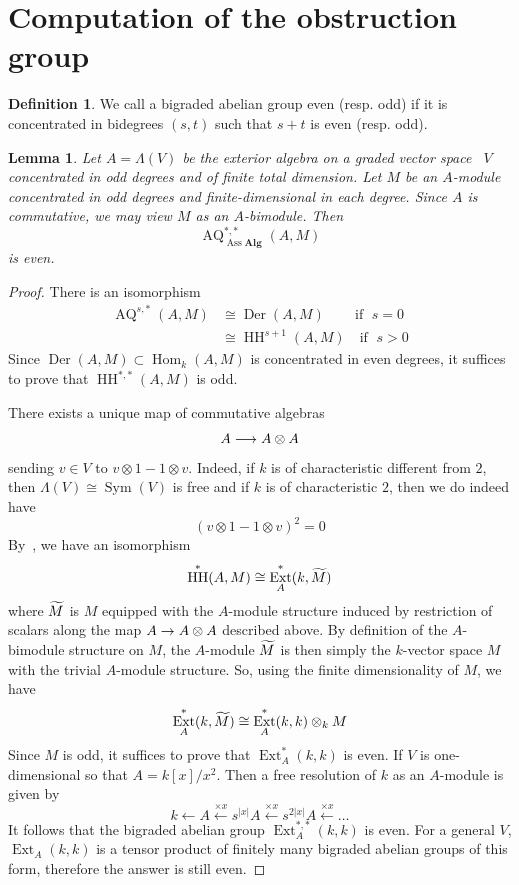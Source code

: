 \documentclass[10pt]{amsart}
\newtheorem{lemm}[theo]{Lemma}\newtheorem{prop}[theo]{Proposition}\newtheorem{coro}[theo]{Corollary}\newtheorem{conj}[theo]{Conjecture}
\theoremstyle{definition}\newtheorem{defi}[theo]{Definition}\newtheorem{rema}[theo]{Remark}\newtheorem{exam}[theo]{Example}\newtheorem{exem}[theo]{Example}\newtheorem{nota}[theo]{Notation}
\DeclareMathOperator{\Ass}{Ass}
\DeclareMathOperator{\Ext}{Ext}
\DeclareMathOperator{\Hom}{Hom}
\DeclareMathOperator{\HH}{HH}
\DeclareMathOperator{\Der}{Der}
\DeclareMathOperator{\AQ}{AQ}
\DeclareMathOperator{\sym}{Sym}
\newcommand{\alg}{\mathbf{Alg}}
\renewcommand*{\to}{\mathchoice{\longrightarrow}{\rightarrow}{\rightarrow}{\rightarrow}}
\let\oldtilde\tilde
\renewcommand*{\tilde}[1]{\mathchoice{\widetilde{#1}}{\widetilde{#1}}{\oldtilde{#1}}{\oldtilde{#1}}}
\begin{document}
\setcounter{section}{3}
\section{Computation of the obstruction group}

\begin{defi}
We call a bigraded abelian group even (resp. odd) if it is concentrated in bidegrees $(s,t)$ such that $s+t$ is even (resp. odd).
\end{defi}


\begin{lemm}\label{lemm : Hochschild}
Let $A=\Lambda(V)$ be the exterior algebra on a graded vector space ~$V$ concentrated in odd degrees and of finite total dimension. Let $M$ be an $A$-module concentrated in odd degrees and finite-dimensional in each degree. Since $A$ is commutative, we may view $M$ as an $A$-bimodule. Then
\[
\AQ_{\Ass\alg}^{*,*}(A,M)
\]
is even.
\end{lemm}

\begin{proof}
There is an isomorphism
\begin{align*}
\AQ^{s,*}(A,M)&\cong \Der(A,M)\qquad\,\text{if }\;s=0\\
&\cong \HH^{s+1}(A,M)\quad\text{if }\;s>0
\end{align*}
Since $\Der(A,M)\subset \Hom_k(A,M)$ is concentrated in even degrees, it suffices to prove that $\HH^{*,*}(A,M)$ is odd.

There exists a unique map of commutative algebras
\[
A\to A\otimes A
\]
sending $v\in V$ to $v\otimes 1-1\otimes v$. Indeed, if $k$ is of characteristic different from $2$, then $\Lambda(V)\cong\sym(V)$ is free and if $k$ is of characteristic $2$, then we do indeed have
\[
(v\otimes 1-1\otimes v)^2=0
\]
By~\cite[Theorem~X.6.1]{cartaneilenberg}, we have an isomorphism
\[
\HH^*(A,M)\cong\Ext^*_A(k,\tilde{M})
\]
where $\tilde{M}$ is $M$ equipped with the $A$-module structure induced by restriction of scalars along the map $A\to A\otimes A$ described above. By definition of the $A$-bimodule structure on $M$, the $A$-module $\tilde{M}$ is then simply the $k$-vector space $M$ with the trivial $A$-module structure. So, using the finite dimensionality of $M$, we have
\[
\Ext_A^*(k,\tilde{M})\cong \Ext^*_A(k,k)\otimes_kM
\]
Since $M$ is odd, it suffices to prove that $\Ext^*_A(k,k)$ is even. If $V$ is one-dimensional so that $A=k[x]/x^2$. Then a free resolution of $k$ as an $A$-module is given by
\[
k\leftarrow{A}\xleftarrow{\times x} s^{|x|}A \xleftarrow{\times x}s^{2|x|}A\xleftarrow{\times x}\ldots
\]
It follows that the bigraded abelian group $\Ext^{*,*}_A(k,k)$ is even. For a general $V$, $\Ext_A(k,k)$ is a tensor product of finitely many bigraded abelian groups of this form, therefore the answer is still even.
\end{proof}
\setcounter{section}{4}
\end{document}
